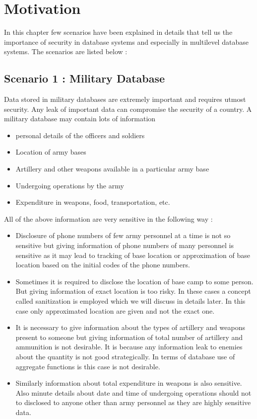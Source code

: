 \documentclass[11pt,a4paper]{report}
\begin{document}
\chapter{Motivation}
In this chapter few scenarios have been explained in details that tell us the importance of security in database systems 
and especially in multilevel database systems. The scenarios are listed below : 

\section{Scenario 1 : Military Database}
Data stored in military databases are extremely important and requires utmost security. Any leak of important data can compromise the security of a country. A military database may contain lots of information 
\begin{itemize}
    \item personal details of the officers and soldiers
    \item Location of army bases
    \item Artillery and other weapons available in a particular army base
    \item Undergoing operations by the army
    \item Expenditure in weapons, food, transportation, etc.
\end{itemize}
All of the above information are very sensitive in the following way : 
\begin{itemize}
    \item Disclosure of phone numbers of few army personnel at a time is not so sensitive but giving information of phone numbers of many personnel is sensitive as it may lead to tracking of base location  or approximation of base location based on the initial codes of the phone numbers.
    \item Sometimes it is required to disclose the location of base camp to some person. But giving information of exact location is too risky. In these cases a concept called sanitization is employed which we will discuss in details later. In this case only approximated location are given and not the exact one.
    \item It is necessary to give information about the types of artillery and weapons present to someone but giving information of total number of artillery and ammunition is not desirable. It is because any information leak to enemies about the quantity is not good strategically. In  terms of database use of aggregate functions is this case is not desirable.
    \item Similarly information about total expenditure in weapons is also sensitive. Also minute details about date and time of undergoing operations should not to disclosed to anyone other than army personnel as they are highly sensitive data. 
\end{itemize}
\end{document}
